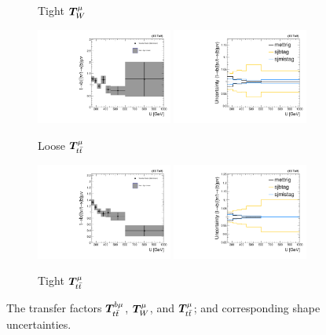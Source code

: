 \begin{figure}[]
\begin{center}
\begin{subfigure}[t]{0.49\textwidth}
            \caption{Tight $\bm{T}^{\mu}_{W}$}
        \end{subfigure}
        \begin{subfigure}[t]{0.49\textwidth}
            \includegraphics[width=0.49\textwidth]{figures/monotop/xfer/rfactor_singlemuonwtop_loose.pdf}
            \includegraphics[width=0.49\textwidth]{figures/monotop/uncertainties/variations_singlemuonwtop_loose.pdf}
            \caption{Loose $\bm{T}^{\mu}_{t\bar{t}}$}
        \end{subfigure}
        \begin{subfigure}[t]{0.49\textwidth}
            \includegraphics[width=0.49\textwidth]{figures/monotop/xfer/rfactor_singlemuonwtop.pdf}
            \includegraphics[width=0.49\textwidth]{figures/monotop/uncertainties/variations_singlemuonwtop.pdf}
            \caption{Tight $\bm{T}^{\mu}_{t\bar{t}}$}
        \end{subfigure}
        \caption{The transfer factors $\bm{T}^{b\mu}_{t\bar{t}}$, $\bm{T}^{\mu}_{W}$, and $\bm{T}^{\mu}_{t\bar{t}}$; and corresponding shape uncertainties.}
        \label{fig:mt:mn_xfer}
    \end{center}
\end{figure}

